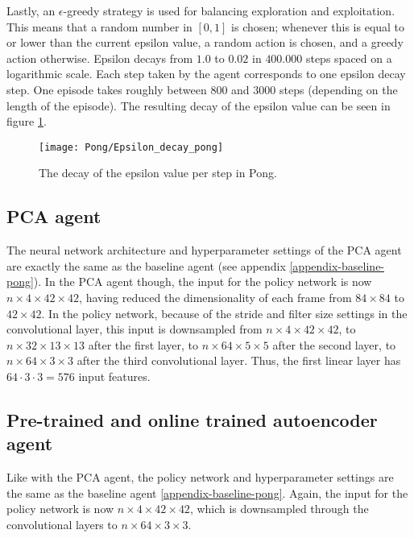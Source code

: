 Lastly, an $\epsilon$-greedy strategy is used for balancing exploration and exploitation. This means that a random number in $[0,1]$ is chosen; whenever this is equal to or lower than the current epsilon value, a random action is chosen, and a greedy action otherwise. Epsilon decays from $1.0$ to $0.02$ in $400.000$ steps spaced on a logarithmic scale. Each step taken by the agent corresponds to one epsilon decay step. One episode takes roughly between $800$ and $3000$ steps (depending on the length of the episode). The resulting decay of the epsilon value can be seen in figure \ref{fig:epsilon-pong}.

\begin{figure}[h]
    \centering
    \texttt{[image: Pong/Epsilon\_decay\_pong]}
    \caption{The decay of the epsilon value per step in Pong.}
    \label{fig:epsilon-pong}
\end{figure}

\subsection{PCA agent}
The neural network architecture and hyperparameter settings of the PCA agent are exactly the same as the baseline agent (see appendix \ref{appendix-baseline-pong}). In the PCA agent though, the input for the policy network is now $n \times 4 \times 42 \times 42$, having reduced the dimensionality of each frame from $84 \times 84$ to $42 \times 42$. In the policy network, because of the stride and filter size settings in the convolutional layer, this input is downsampled from $n \times 4 \times 42 \times 42$, to $n \times 32 \times 13 \times 13$ after the first layer, to $n \times 64 \times 5 \times 5$ after the second layer, to $n \times 64 \times 3 \times 3$ after the third convolutional layer. Thus, the first linear layer has $64 \cdot 3 \cdot 3 = 576$ input features.


\subsection{Pre-trained and online trained autoencoder agent} %
Like with the PCA agent, the policy network and hyperparameter settings are the same as the baseline agent \ref{appendix-baseline-pong}. Again, the input for the policy network is now $n \times 4 \times 42 \times 42$, which is downsampled through the convolutional layers to $n \times 64 \times 3 \times 3$. \newline

